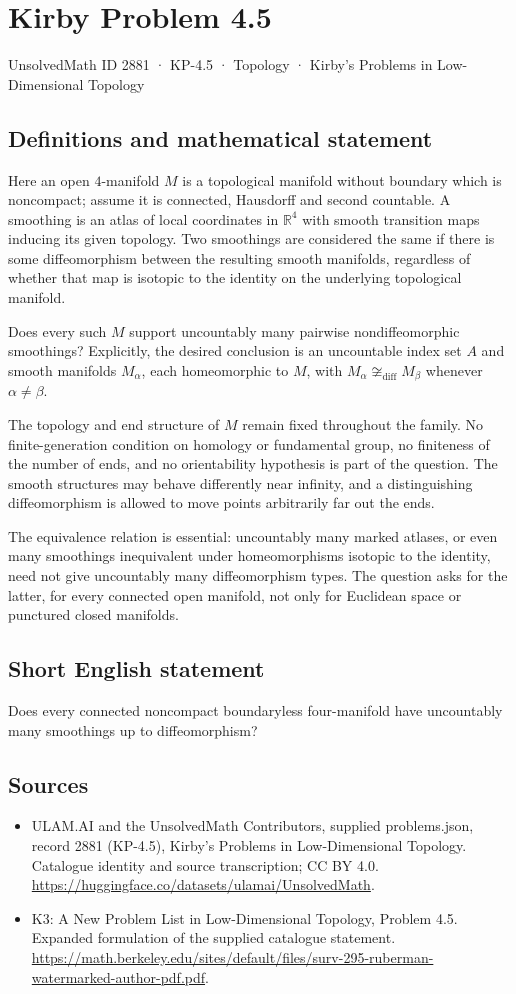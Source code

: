 \documentclass[11pt,a4paper]{article}
\begin{document}
\section*{Kirby Problem 4.5}\label{2881}
{\small UnsolvedMath ID 2881 · KP-4.5 · Topology · Kirby's Problems in Low-Dimensional Topology}
\subsection{Definitions and mathematical statement}
Here an open $4$-manifold $M$ is a topological manifold without boundary
which is noncompact; assume it is connected, Hausdorff and second
countable. A smoothing is an atlas of local coordinates in $\mathbb R^4$
with smooth transition maps inducing its given topology. Two smoothings
are considered the same if there is some diffeomorphism between the
resulting smooth manifolds, regardless of whether that map is isotopic
to the identity on the underlying topological manifold.

Does every such $M$ support uncountably many pairwise nondiffeomorphic
smoothings? Explicitly, the desired conclusion is an uncountable index
set $A$ and smooth manifolds $M_\alpha$, each homeomorphic to $M$,
with $M_\alpha\not\cong_{\mathrm{diff}}M_\beta$ whenever
$\alpha\ne\beta$.

The topology and end structure of $M$ remain fixed throughout the
family. No finite-generation condition on homology or fundamental group,
no finiteness of the number of ends, and no orientability hypothesis
is part of the question. The smooth structures may behave differently
near infinity, and a distinguishing diffeomorphism is allowed to move
points arbitrarily far out the ends.

The equivalence relation is essential: uncountably many marked atlases,
or even many smoothings inequivalent under homeomorphisms isotopic to
the identity, need not give uncountably many diffeomorphism types.
The question asks for the latter, for every connected open manifold,
not only for Euclidean space or punctured closed manifolds.
\subsection{Short English statement}
Does every connected noncompact boundaryless four-manifold have uncountably many smoothings up to diffeomorphism?
\subsection{Sources}
\begin{itemize}
\item[S1] ULAM.AI and the UnsolvedMath Contributors, supplied problems.json, record 2881 (KP-4.5), Kirby's Problems in Low-Dimensional Topology. Catalogue identity and source transcription; CC BY 4.0.
\url{https://huggingface.co/datasets/ulamai/UnsolvedMath}.
\item[S2] K3: A New Problem List in Low-Dimensional Topology, Problem 4.5. Expanded formulation of the supplied catalogue statement.
\url{https://math.berkeley.edu/sites/default/files/surv-295-ruberman-watermarked-author-pdf.pdf}.
\end{itemize}
\end{document}
